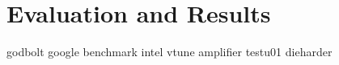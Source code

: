 \documentclass{stdlocal}
\begin{document}
  \section{Evaluation and Results} %
  \label{sec:evaluation}
    \autocite{compiler-explorer,intel-intrinsics-guide,perfevent,vandevoorde2018,meyers2014}

    godbolt
    google benchmark
    intel vtune amplifier
    testu01
    dieharder
\end{document}
